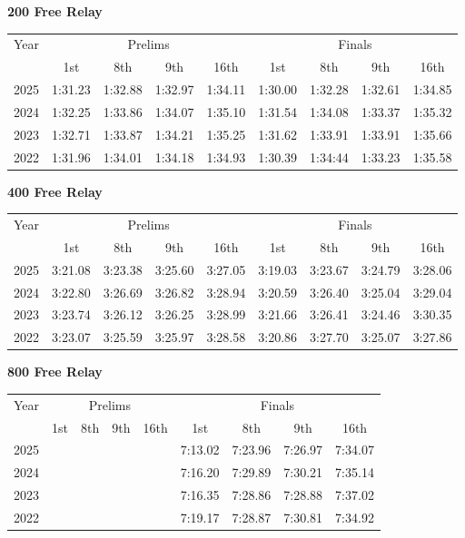 \textbf{200 Free Relay}

\begin{flushleft}
\begin{tabular}{|c|c|c|c|c|c|c|c|c|}
\hline
Year & \multicolumn{4}{c|}{Prelims} & \multicolumn{4}{c|}{Finals} \\
\cline{2-9}
& 1st & 8th & 9th & 16th & 1st & 8th & 9th & 16th \\
\hline
2025 & 1:31.23 & 1:32.88 & 1:32.97 & 1:34.11 & 1:30.00 & 1:32.28 & 1:32.61 & 1:34.85 \\
2024 & 1:32.25 & 1:33.86 & 1:34.07 & 1:35.10 & 1:31.54 & 1:34.08 & 1:33.37 & 1:35.32 \\
2023 & 1:32.71 & 1:33.87 & 1:34.21 & 1:35.25 & 1:31.62 & 1:33.91 & 1:33.91 & 1:35.66 \\
2022 & 1:31.96 & 1:34.01 & 1:34.18 & 1:34.93 & 1:30.39 & 1:34:44 & 1:33.23 & 1:35.58 \\
\hline
\end{tabular}
\end{flushleft}

\textbf{400 Free Relay}

\begin{flushleft}
\begin{tabular}{|c|c|c|c|c|c|c|c|c|}
\hline
Year & \multicolumn{4}{c|}{Prelims} & \multicolumn{4}{c|}{Finals} \\
\cline{2-9}
& 1st & 8th & 9th & 16th & 1st & 8th & 9th & 16th \\
\hline
2025 & 3:21.08 & 3:23.38 & 3:25.60 & 3:27.05 & 3:19.03 & 3:23.67 & 3:24.79 & 3:28.06 \\
2024 & 3:22.80 & 3:26.69 & 3:26.82 & 3:28.94 & 3:20.59 & 3:26.40 & 3:25.04 & 3:29.04 \\
2023 & 3:23.74 & 3:26.12 & 3:26.25 & 3:28.99 & 3:21.66 & 3:26.41 & 3:24.46 & 3:30.35 \\
2022 & 3:23.07 & 3:25.59 & 3:25.97 & 3:28.58 & 3:20.86 & 3:27.70 & 3:25.07 & 3:27.86 \\
\hline
\end{tabular}
\end{flushleft}

\textbf{800 Free Relay}

\begin{flushleft}
\begin{tabular}{|c|c|c|c|c|c|c|c|c|}
\hline
Year & \multicolumn{4}{c|}{Prelims} & \multicolumn{4}{c|}{Finals} \\
\cline{2-9}
& 1st & 8th & 9th & 16th & 1st & 8th & 9th & 16th \\
\hline
2025 &  &  &  &  & 7:13.02 & 7:23.96 & 7:26.97 & 7:34.07 \\
2024 &  &  &  &  & 7:16.20 & 7:29.89 & 7:30.21 & 7:35.14 \\
2023 &  &  &  &  & 7:16.35 & 7:28.86 & 7:28.88 & 7:37.02 \\
2022 &  &  &  &  & 7:19.17 & 7:28.87 & 7:30.81 & 7:34.92 \\
\hline
\end{tabular}
\end{flushleft}
